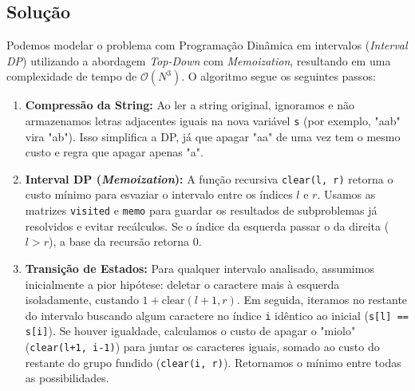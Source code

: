 \documentclass[12pt,a4paper]{article}
\begin{document}
\subsection{Solução}
Podemos modelar o problema com Programação Dinâmica em intervalos (\textit{Interval DP}) utilizando a abordagem \textit{Top-Down} com \textit{Memoization}, resultando em uma complexidade de tempo de $\mathcal{O}(N^3)$. O algoritmo segue os seguintes passos:

\begin{enumerate}
\item \textbf{Compressão da String:} Ao ler a string original, ignoramos e não armazenamos letras adjacentes iguais na nova variável \texttt{s} (por exemplo, "aab" vira "ab"). Isso simplifica a DP, já que apagar "aa" de uma vez tem o mesmo custo e regra que apagar apenas "a".
    \item \textbf{Interval DP (\textit{Memoization}):} A função recursiva \texttt{clear(l, r)} retorna o custo mínimo para esvaziar o intervalo entre os índices $l$ e $r$. Usamos as matrizes \texttt{visited} e \texttt{memo} para guardar os resultados de subproblemas já resolvidos e evitar recálculos. Se o índice da esquerda passar o da direita ($l > r$), a base da recursão retorna 0.
    \item \textbf{Transição de Estados:} Para qualquer intervalo analisado, assumimos inicialmente a pior hipótese: deletar o caractere mais à esquerda isoladamente, custando $1 + \text{clear}(l+1, r)$. Em seguida, iteramos no restante do intervalo buscando algum caractere no índice \texttt{i} idêntico ao inicial (\texttt{s[l] == s[i]}). Se houver igualdade, calculamos o custo de apagar o "miolo" (\texttt{clear(l+1, i-1)}) para juntar os caracteres iguais, somado ao custo do restante do grupo fundido (\texttt{clear(i, r)}). Retornamos o mínimo entre todas as possibilidades.
\end{enumerate}
\end{document}
